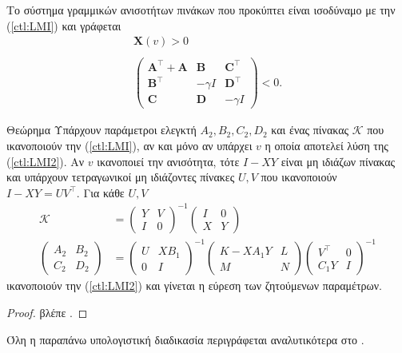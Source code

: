 Το σύστημα γραμμικών ανισοτήτων πινάκων που προκύπτει είναι ισοδύναμο με την 
(\ref{ctl:LMI}) και γράφεται
\begin{equation}
    \begin{aligned}
    \mathbf{X}(v) > 0 \\
    \\
    \begin{pmatrix}
        \mathbf{A}^{\intercal} + \mathbf{A} & \mathbf{B} & 
        \mathbf{C}^{\intercal}\\
        \mathbf{B}^{\intercal} & -\gamma I & \mathbf{D}^{\intercal}\\
        \mathbf{C} & \mathbf{D} & -\gamma I
    \end{pmatrix}
    < 0.
    \end{aligned}
    \label{ctl:LMI2}
\end{equation}


\begin{namedthrm}{Θεώρημα}
    Υπάρχουν παράμετροι ελεγκτή $A_2, B_2, C_2, D_2$ και ένας πίνακας 
    $\mathcal{K}$ που ικανοποιούν την (\ref{ctl:LMI}), αν και μόνο αν υπάρχει 
    $v$ η οποία αποτελεί λύση της (\ref{ctl:LMI2}). Αν $v$ ικανοποιεί την 
    ανισότητα, τότε $I - XY$ είναι μη ιδιάζων πίνακας και υπάρχουν τετραγωνικοί 
    μη ιδιάζοντες πίνακες $U, V$ που ικανοποιούν $I - XY = UV^{\intercal}$. Για 
    κάθε $U, V$
    \begin{align*}
        \mathcal{K} &= 
        \begin{pmatrix}
            Y & V \\
            I & 0
        \end{pmatrix}^{-1}
        \begin{pmatrix}
            I & 0 \\
            X & Y
        \end{pmatrix} \\
        \begin{pmatrix}
            A_2 & B_2 \\
            C_2 & D_2
        \end{pmatrix} &=
        \begin{pmatrix}
            U & X B_1 \\
            0 & I
        \end{pmatrix}^{-1}
        \begin{pmatrix}
            K - X A_1 Y & L \\
            M & N
        \end{pmatrix}
        \begin{pmatrix}
            V^{\intercal} & 0 \\
            C_1 Y & I
        \end{pmatrix}^{-1} 
    \end{align*}
    ικανοποιούν την (\ref{ctl:LMI2}) και γίνεται η εύρεση των ζητούμενων 
    παραμέτρων.
\end{namedthrm}
\begin{proof}
    βλέπε \cite{Scherer}.
\end{proof}
Όλη η παραπάνω υπολογιστική διαδικασία περιγράφεται αναλυτικότερα στο 
\cite{Scherer}.